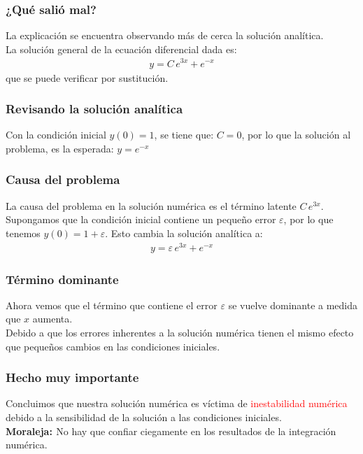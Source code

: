 \documentclass[12pt]{beamer}
\begin{document}
\begin{frame}
\frametitle{¿Qué salió mal?}
La explicación se encuentra observando más de cerca la solución analítica.
\\
\bigskip
\pause
La solución general de la ecuación diferencial dada es:
\pause
\begin{align*}
y = C \, e^{3 x} + e^{-x}
\end{align*}
que se puede verificar por sustitución.
\end{frame}
\begin{frame}
\frametitle{Revisando la solución analítica}
Con la condición inicial $y (0) = 1$, \pause se tiene que: $C = 0$, \pause por lo que la solución al problema, es la esperada: $y = e^{-x}$
\end{frame}
\begin{frame}
\frametitle{Causa del problema}
La causa del problema en la solución numérica es el término latente $C \, e^{3 x}$.
\\
\bigskip
\pause
Supongamos que la condición inicial contiene un pequeño error $\varepsilon$, por lo que tenemos $y (0) = 1 + \varepsilon$. \pause Esto cambia la solución analítica a:
\pause
\begin{align*}
y = \varepsilon \, e^{3 x} + e^{-x}
\end{align*}
\end{frame}
\begin{frame}
\frametitle{Término dominante}
Ahora vemos que el término que contiene el error $\varepsilon$ se vuelve dominante a medida que $x$ aumenta.
\\
\bigskip
\pause
Debido a que los errores inherentes a la solución numérica tienen el mismo efecto que pequeños cambios en las condiciones iniciales.
\end{frame}
\begin{frame}
\frametitle{Hecho muy importante}
Concluimos que nuestra solución numérica es víctima de \textcolor{red}{inestabilidad numérica} debido a la sensibilidad de la solución a las condiciones iniciales.
\\
\bigskip
\pause
\textbf{\textcolor{airforceblue}{Moraleja: }} No hay que confiar ciegamente en los resultados de la integración numérica.
\end{frame}
\end{document}
